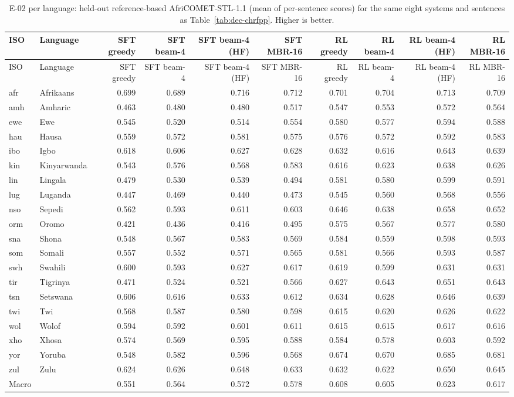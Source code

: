 {\scriptsize\setlength{\tabcolsep}{1.5pt}
\begin{longtable}{@{}llrrrrrrrr@{}}
\caption{E-02 per language: held-out reference-based AfriCOMET-STL-1.1 (mean of per-sentence scores) for the same eight systems and sentences as Table~\ref{tab:dec-chrfpp}. Higher is better.}\label{tab:dec-comet}\\
\toprule
ISO & Language & SFT greedy & SFT beam-4 & SFT beam-4 (HF) & SFT MBR-16 & RL greedy & RL beam-4 & RL beam-4 (HF) & RL MBR-16 \\
\midrule\endfirsthead
\toprule
ISO & Language & SFT greedy & SFT beam-4 & SFT beam-4 (HF) & SFT MBR-16 & RL greedy & RL beam-4 & RL beam-4 (HF) & RL MBR-16 \\
\midrule\endhead
\midrule\endfoot
\bottomrule\endlastfoot
afr & Afrikaans & 0.699 & 0.689 & 0.716 & 0.712 & 0.701 & 0.704 & 0.713 & 0.709 \\
amh & Amharic & 0.463 & 0.480 & 0.480 & 0.517 & 0.547 & 0.553 & 0.572 & 0.564 \\
ewe & Ewe & 0.545 & 0.520 & 0.514 & 0.554 & 0.580 & 0.577 & 0.594 & 0.588 \\
hau & Hausa & 0.559 & 0.572 & 0.581 & 0.575 & 0.576 & 0.572 & 0.592 & 0.583 \\
ibo & Igbo & 0.618 & 0.606 & 0.627 & 0.628 & 0.632 & 0.616 & 0.643 & 0.639 \\
kin & Kinyarwanda & 0.543 & 0.576 & 0.568 & 0.583 & 0.616 & 0.623 & 0.638 & 0.626 \\
lin & Lingala & 0.479 & 0.530 & 0.539 & 0.494 & 0.581 & 0.580 & 0.599 & 0.591 \\
lug & Luganda & 0.447 & 0.469 & 0.440 & 0.473 & 0.545 & 0.560 & 0.568 & 0.556 \\
nso & Sepedi & 0.562 & 0.593 & 0.611 & 0.603 & 0.646 & 0.638 & 0.658 & 0.652 \\
orm & Oromo & 0.421 & 0.436 & 0.416 & 0.495 & 0.575 & 0.567 & 0.577 & 0.580 \\
sna & Shona & 0.548 & 0.567 & 0.583 & 0.569 & 0.584 & 0.559 & 0.598 & 0.593 \\
som & Somali & 0.557 & 0.552 & 0.571 & 0.565 & 0.581 & 0.566 & 0.593 & 0.587 \\
swh & Swahili & 0.600 & 0.593 & 0.627 & 0.617 & 0.619 & 0.599 & 0.631 & 0.631 \\
tir & Tigrinya & 0.471 & 0.524 & 0.521 & 0.566 & 0.627 & 0.643 & 0.651 & 0.643 \\
tsn & Setswana & 0.606 & 0.616 & 0.633 & 0.612 & 0.634 & 0.628 & 0.646 & 0.639 \\
twi & Twi & 0.568 & 0.587 & 0.580 & 0.598 & 0.615 & 0.620 & 0.626 & 0.622 \\
wol & Wolof & 0.594 & 0.592 & 0.601 & 0.611 & 0.615 & 0.615 & 0.617 & 0.616 \\
xho & Xhosa & 0.574 & 0.569 & 0.595 & 0.588 & 0.584 & 0.578 & 0.603 & 0.592 \\
yor & Yoruba & 0.548 & 0.582 & 0.596 & 0.568 & 0.674 & 0.670 & 0.685 & 0.681 \\
zul & Zulu & 0.624 & 0.626 & 0.648 & 0.633 & 0.632 & 0.622 & 0.650 & 0.645 \\
\midrule Macro &  & 0.551 & 0.564 & 0.572 & 0.578 & 0.608 & 0.605 & 0.623 & 0.617 \\
\end{longtable}}
